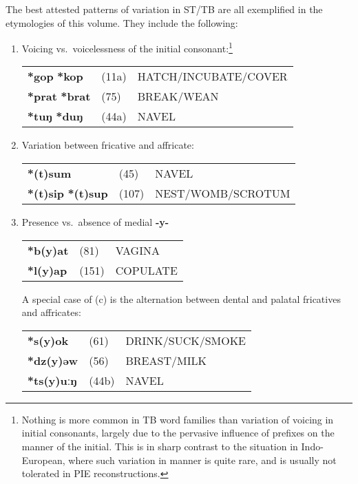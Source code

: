 The best attested patterns of variation in ST/TB are all exemplified in the
etymologies of this volume.  They include the following:

\begin{enumerate}
\item %
Voicing vs.\ voicelessness of the initial consonant:\footnote{Nothing is
more common in TB word families than variation of voicing in initial consonants,
largely due to the pervasive influence of prefixes on the manner of the initial.
 This is in sharp contrast to the situation in Indo-European, where such
variation in manner is quite rare, and is usually not tolerated in PIE
reconstructions.}\nopagebreak[4]

\begin{tabular}{lll}
\textbf{*gop} \STEDTU{⪤} \textbf{*kop}	&(11a)	&HATCH/INCUBATE/COVER\\
\textbf{*prat} \STEDTU{⪤} \textbf{*brat}	&(75)	&BREAK/WEAN\\
\textbf{*tuŋ} \STEDTU{⪤} \textbf{*duŋ}	&(44a)	&NAVEL\\
\end{tabular}

\item %
Variation between fricative and affricate:

\begin{tabular}{lll}
\textbf{*(t)sum}	&(45)		&NAVEL\\
\textbf{*(t)sip} \STEDTU{⪤} \textbf{*(t)sup} &(107)	&NEST/WOMB/SCROTUM\footnotemark\\
\end{tabular}

\item %
Presence vs.\ absence of medial \textbf{-y-}

\begin{tabular}{lll}
\textbf{*b(y)at}	&(81)		&VAGINA\\
\textbf{*l(y)ap}	&(151)		&COPULATE\\
\end{tabular}

A special case of (c) is the alternation between dental and palatal fricatives
and affricates:

\begin{tabular}{lll}
\textbf{*s(y)ok}	&(61)		&DRINK/SUCK/SMOKE\\
\textbf{*dz(y)əw}	&(56)		&BREAST/MILK\\
\textbf{*ts(y)uːŋ}	&(44b)		&NAVEL\\
\end{tabular}


\end{enumerate}
